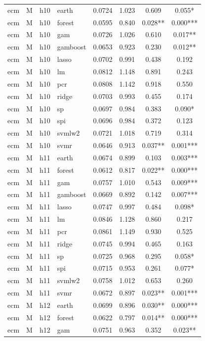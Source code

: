\begin{ThreePartTable}
\begin{longtable}[t]{llclcccc}
\addlinespace
ecm & M & h10 & earth & 0.0724 & 1.023 & 0.609 & 0.055*\\
ecm & M & h10 & forest & 0.0595 & 0.840 & 0.028** & 0.000***\\
ecm & M & h10 & gam & 0.0726 & 1.026 & 0.610 & 0.017**\\
ecm & M & h10 & gamboost & 0.0653 & 0.923 & 0.230 & 0.012**\\
ecm & M & h10 & lasso & 0.0702 & 0.991 & 0.438 & 0.192\\
ecm & M & h10 & lm & 0.0812 & 1.148 & 0.891 & 0.243\\
ecm & M & h10 & pcr & 0.0808 & 1.142 & 0.918 & 0.550\\
ecm & M & h10 & ridge & 0.0703 & 0.993 & 0.455 & 0.174\\
ecm & M & h10 & sp & 0.0697 & 0.984 & 0.383 & 0.090*\\
ecm & M & h10 & spi & 0.0696 & 0.984 & 0.372 & 0.123\\
ecm & M & h10 & svmlw2 & 0.0721 & 1.018 & 0.719 & 0.314\\
ecm & M & h10 & svmr & 0.0646 & 0.913 & 0.037** & 0.001***\\
\addlinespace
ecm & M & h11 & earth & 0.0674 & 0.899 & 0.103 & 0.003***\\
ecm & M & h11 & forest & 0.0612 & 0.817 & 0.022** & 0.000***\\
ecm & M & h11 & gam & 0.0757 & 1.010 & 0.543 & 0.009***\\
ecm & M & h11 & gamboost & 0.0669 & 0.892 & 0.142 & 0.007***\\
ecm & M & h11 & lasso & 0.0747 & 0.997 & 0.484 & 0.098*\\
ecm & M & h11 & lm & 0.0846 & 1.128 & 0.860 & 0.217\\
ecm & M & h11 & pcr & 0.0861 & 1.149 & 0.930 & 0.525\\
ecm & M & h11 & ridge & 0.0745 & 0.994 & 0.465 & 0.163\\
ecm & M & h11 & sp & 0.0725 & 0.968 & 0.295 & 0.058*\\
ecm & M & h11 & spi & 0.0715 & 0.953 & 0.261 & 0.077*\\
ecm & M & h11 & svmlw2 & 0.0758 & 1.012 & 0.653 & 0.260\\
ecm & M & h11 & svmr & 0.0672 & 0.897 & 0.023** & 0.001***\\
\addlinespace
ecm & M & h12 & earth & 0.0699 & 0.896 & 0.030** & 0.000***\\
ecm & M & h12 & forest & 0.0622 & 0.797 & 0.014** & 0.000***\\
ecm & M & h12 & gam & 0.0751 & 0.963 & 0.352 & 0.023**\\

\end{longtable}
\end{ThreePartTable}
